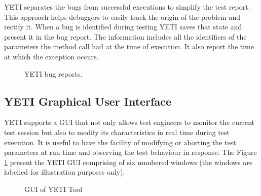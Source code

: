 YETI separates the bugs from successful executions to simplify the test report. This approach helps debuggers to easily track the origin of the problem and rectify it. When a bug is identified during testing YETI saves that state and present it in the bug report. The information includes all the identifiers of the parameters the method call had at the time of execution. It also report the time at which the exception occurs.

\begin{figure}[h]
	\centering
	\caption{YETI bug reports.}
\end{figure}

\subsection{YETI Graphical User Interface}
YETI supports a GUI that not only allows test engineers to monitor the current test session but also to modify its characteristics in real time during test execution. It is useful to have the facility of modifying or aborting the test parameters at run time and observing the test behaviour in response. The Figure \ref{fig:yetiGUI} present the YETI GUI comprising of six numbered windows (the windows are labelled for illustration purposes only).

\begin{figure}[h]
	\centering
	\label{fig:yetiGUI}
	\caption{GUI of YETI Tool}
\end{figure}

